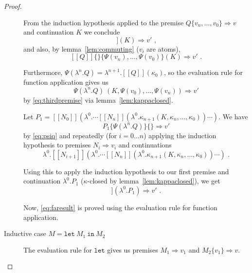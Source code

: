 \documentclass[a4paper,11pt,draft]{article}
\newcommand{\kw}[1]{\mathtt{#1}}
\begin{document}
\begin{proof}
\begin{description}
From the induction hypothesis applied to the premise $Q\{v_{n}, \ldots, v_{0}\} \Rightarrow v$
and continuation $K$ we conclude
\begin{equation*}
  [\![Q\{v_{n}, \ldots, v_{0}\}]\!] (K) \Rightarrow v' \text{ ,}
\end{equation*}
and also, by lemma~\ref{lem:commuting} ($v_{i}$ are atoms),
\begin{equation}\label{eq:thirdpremise}
  [\![Q]\!]\{\}\{\Psi(v_{n}), \ldots, \Psi(v_{0})\} (K) \Rightarrow v' \text{ .}
\end{equation}

Furthermore, $\Psi(\lambda^{n}.Q) = \lambda^{n+1}.[\![Q]\!](\kappa_{0})$, so
the evaluation rule for function application gives us
\begin{equation}\label{eq:psiq}
  \Psi(\lambda^{n}.Q) \: (K, \Psi(v_{0}), \ldots, \Psi(v_{n})) \Rightarrow v'
\end{equation}
by \eqref{eq:thirdpremise} via lemma~\ref{lem:kappaclosed}.


Let $P_{1} = [\![N_{0}]\!](\lambda^{0}. \cdots [\![N_{n}]\!](\lambda^{0}.\kappa_{n+1}(K, \kappa_{n}, \ldots, \kappa_{0})) \cdots )$.
We have
\begin{equation}\label{eq:p1}
  P_{1}\{\Psi(\lambda^{n}.Q)\}\{\} \Rightarrow v'
\end{equation}
by \eqref{eq:psiq} and repeatedly (for $i = 0 \ldots n$) applying the
induction hypothesis to premises $N_{i} \Rightarrow v_{i}$ and continuations
\begin{equation*}
  \lambda^{0}. [\![N_{i+1}]\!] (\lambda^{0}. \cdots [\![N_{n}]\!](\lambda^{0}.\kappa_{n+1}(K, \kappa_{n}, \ldots, \kappa_{0})) \cdots ) \text{ .}
\end{equation*}

Using this to apply the induction hypothesis to our first
premise and continuation
$\lambda^{0}.P_{1}$ ($\kappa$-closed by lemma~\ref{lem:kappaclosed}), we get
\begin{equation*}
[\![M_{1}]\!](\lambda^{0}.P_{1}) \Rightarrow v' \text{ .}
\end{equation*}

Now, \eqref{eq:faresult} is proved using the evaluation rule for
function application.

\item[\sffamily Inductive case $M = \kw{let} \: M_{1} \: \kw{in} \: M_{2}$]\hfill


The evaluation rule for $\kw{let}$ gives us premises $M_{1} \Rightarrow v_{1}$ and $M_{2}\{v_{1}\} \Rightarrow v$.


\end{description}
\end{proof}
\end{document}
